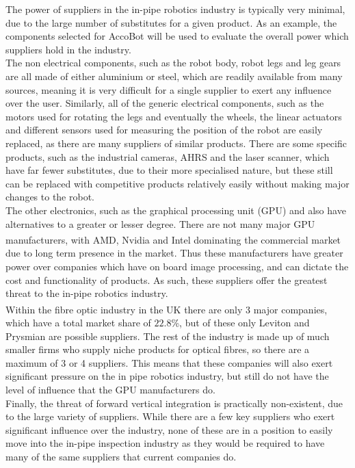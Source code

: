 \documentclass[11pt]{article}		%
\newcommand{\supercite}[1]{\textsuperscript{\cite{#1}}}		%
\begin{document}
				The power of suppliers in the in-pipe robotics industry is typically very minimal, due to the large number of substitutes for a given product.
				As an example, the components selected for AccoBot will be used to evaluate the overall power which suppliers hold in the industry.
				\\
				The non electrical components, such as the robot body, robot legs and leg gears are all made of either aluminium or steel, which are readily available from many sources, meaning it is very difficult for a single supplier to exert any influence over the user.
				Similarly, all of the generic electrical components, such as the motors used for rotating the legs and eventually the wheels, the linear actuators and different sensors used for measuring the position of the robot are easily replaced, as there are many suppliers of similar products.
				There are some specific products, such as the industrial cameras, AHRS and the laser scanner, which have far fewer substitutes, due to their more specialised nature, but these still can be replaced with competitive products relatively easily without making major changes to the robot.
				\\
				The other electronics, such as the graphical processing unit (GPU) and  also have alternatives to a greater or lesser degree.
				There are not many major GPU manufacturers, with AMD, Nvidia and Intel dominating the commercial market\supercite{rake2020graphic} due to long term presence in the market.
				Thus these manufacturers have greater power over companies which have on board image processing, and can dictate the cost and functionality of  products.
				As such, these suppliers offer the greatest threat to the in-pipe robotics industry.
				\\
				Within the fibre optic industry in the UK there are only 3 major companies\supercite{neve2020fibreoptic}, which have a total market share of $22.8$\%, but of these only Leviton and Prysmian are possible suppliers.
				The rest of the industry is made up of much smaller firms who supply niche products for optical fibres, so there are a maximum of 3 or 4 suppliers.
				This means that these companies will also exert significant pressure on the in pipe robotics industry, but still do not have the level of influence that the GPU manufacturers do.
				\\
				Finally, the threat of forward vertical integration is practically non-existent, due to the large variety of suppliers.
				While there are a few key suppliers who exert significant influence over the industry, none of these are in a position to easily move into the in-pipe inspection industry as they would be required to have many of the same suppliers that current companies do.
						
\end{document}
